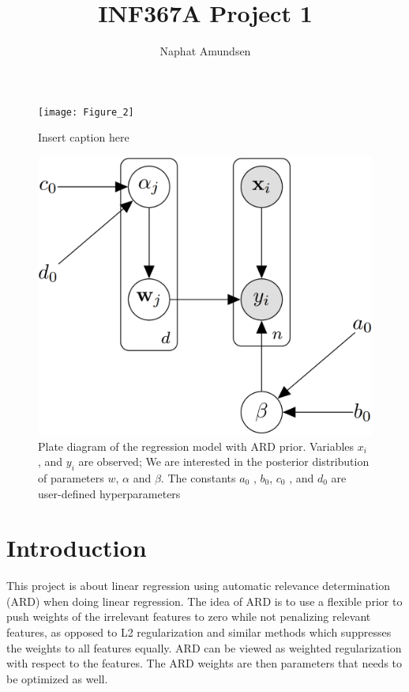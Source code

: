 \documentclass[12pt]{article}
\begin{document}
\title{\textbf{INF367A Project 1}}
\author{Naphat Amundsen}
\maketitle
\sectionfont{\fontsize{14}{15}\selectfont}
\subsectionfont{\fontsize{12}{15}\selectfont}
\subsubsectionfont{\fontsize{12}{15}\selectfont}
\graphicspath{ {./images/} }

\ifx
\begin{figure}[H]
	\centering
	\texttt{[image: Figure\_2]}
	\caption{Insert caption here}
\end{figure}
\fi
\ifx
\begin{figure}[H]
	\centering
	\includegraphics[scale=0.8]{bn_network.png}
	\caption{Plate diagram of the regression model with ARD prior. Variables $x_i$ , and $y_i$ are observed; We are interested in the posterior distribution of parameters $w$, $\alpha$ and $\beta$. The constants $a_0$ , $b_0$, $c_0$ , and $d_0$ are user-defined hyperparameters}
\end{figure}
\fi

\newcommand{\opGamma}{\operatorname{Gamma}}

\section*{Introduction}
    This project is about linear regression using automatic relevance determination (ARD) when doing linear regression. The idea of ARD is to use a flexible prior to push weights of the irrelevant features to zero while not penalizing relevant features, as opposed to L2 regularization and similar methods which suppresses the weights to all features equally. ARD can be viewed as weighted regularization with respect to the features. The ARD weights are then parameters that needs to be optimized as well. 
\end{document}
